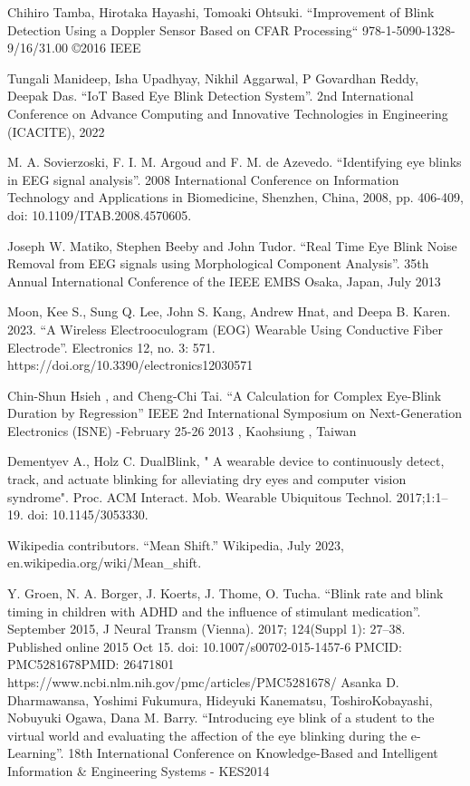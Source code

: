 \documentclass[conference]{IEEEtran}
\begin{document}
\begin{thebibliography}{00}
Chihiro Tamba, Hirotaka Hayashi, Tomoaki Ohtsuki. “Improvement of Blink Detection Using a Doppler Sensor Based on CFAR Processing“  978-1-5090-1328-9/16/31.00 ©2016 IEEE

Tungali Manideep, Isha Upadhyay, Nikhil Aggarwal, P Govardhan Reddy, Deepak Das. “IoT Based Eye Blink Detection System”. 2nd International Conference on Advance Computing and Innovative Technologies in Engineering (ICACITE), 2022


M. A. Sovierzoski, F. I. M. Argoud and F. M. de Azevedo. “Identifying eye blinks in EEG signal analysis”. 2008 International Conference on Information Technology and Applications in Biomedicine, Shenzhen, China, 2008, pp. 406-409, doi: 10.1109/ITAB.2008.4570605.

Joseph W. Matiko, Stephen Beeby and John Tudor. “Real Time Eye Blink Noise Removal from EEG signals using Morphological Component Analysis”. 35th Annual International Conference of the IEEE EMBS
Osaka, Japan, July 2013

Moon, Kee S., Sung Q. Lee, John S. Kang, Andrew Hnat, and Deepa B. Karen. 2023. “A Wireless Electrooculogram (EOG) Wearable Using Conductive Fiber Electrode”.  Electronics 12, no. 3: 571. https://doi.org/10.3390/electronics12030571

Chin-Shun Hsieh , and Cheng-Chi Tai. “A Calculation for Complex Eye-Blink Duration by Regression” IEEE 2nd International Symposium on Next-Generation Electronics (ISNE) -February 25-26 2013 , Kaohsiung , Taiwan

Dementyev A., Holz C. DualBlink, " A wearable device to continuously detect, track, and actuate blinking for alleviating dry eyes and computer vision syndrome". Proc. ACM Interact. Mob. Wearable Ubiquitous Technol. 2017;1:1–19. doi: 10.1145/3053330. 

Wikipedia contributors. “Mean Shift.” Wikipedia, July 2023, en.wikipedia.org/wiki/Mean\_shift.




Y. Groen, N. A. Borger, J. Koerts,  J. Thome,  O. Tucha. “Blink rate and blink timing in children with ADHD and the influence of stimulant medication”. September 2015, J Neural Transm (Vienna). 2017; 124(Suppl 1): 27–38. Published online 2015 Oct 15. doi: 10.1007/s00702-015-1457-6 PMCID: PMC5281678PMID: 26471801
https://www.ncbi.nlm.nih.gov/pmc/articles/PMC5281678/
\bibitem{}
Asanka D. Dharmawansa, Yoshimi Fukumura, Hideyuki Kanematsu, ToshiroKobayashi, Nobuyuki Ogawa, Dana M. Barry. “Introducing eye blink of a student to the virtual world and evaluating the affection of the eye blinking during the e-Learning”. 18th International Conference on Knowledge-Based and Intelligent Information \& Engineering Systems - KES2014


\end{thebibliography}
\end{document}
